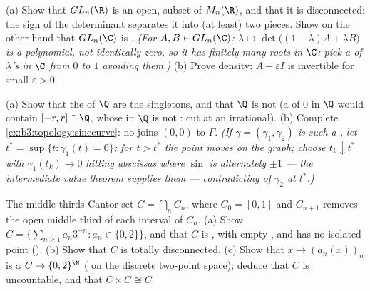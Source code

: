 \begin{exercise}[$\star\star$]\label{exo:b3:topology:8}
(a) Show that $GL_n(\R)$ is an open,  subset of $M_n(\R)$,
and that it is disconnected: the sign of the determinant
separates it into (at least) two pieces. Show on the other hand
that $GL_n(\C)$ is .
\emph{(For $A, B \in GL_n(\C)$: $\lambda \mapsto \det\bigl((1 -
\lambda)A + \lambda B\bigr)$ is a polynomial, not identically
zero, so it has finitely many roots in $\C$: pick a  of
$\lambda$'s in $\C$ from $0$ to $1$ avoiding them.)}
(b) Prove density: $A + \varepsilon I$ is invertible for small
$\varepsilon > 0$.
\end{exercise}

\begin{exercise}[$\star\star$]\label{exo:b3:topology:9}
(a) Show that the  of $\Q$ are the
singletons, and that $\Q$ is not  (a 
 of $0$ in $\Q$ would contain $[-r, r]\cap\Q$,
whose  in $\Q$ is not : cut at an irrational).
(b) Complete \cref{ex:b3:topology:sinecurve}: no  joins
$(0,0)$ to $\Gamma$. \emph{(If $\gamma = (\gamma_1, \gamma_2)$
is such a , let $t^* = \sup\{t : \gamma_1(t) = 0\}$; for $t
> t^*$ the point moves on the graph; choose $t_k \downarrow
t^*$ with $\gamma_1(t_k) \to 0$ hitting abscissas where $\sin$
is alternately $\pm1$ --- the intermediate value theorem
supplies them --- contradicting  of $\gamma_2$ at
$t^*$.)}
\end{exercise}

\begin{exercise}[$\star\star\star$]\label{exo:b3:topology:10}
The middle-thirds Cantor set $C = \bigcap_n C_n$, where $C_0 =
[0,1]$ and $C_{n+1}$ removes the open middle third of each
interval of $C_n$.
(a) Show $C = \bigl\{\sum_{n\geq1} a_n3^{-n} : a_n \in
\{0,2\}\bigr\}$, and that $C$ is , with empty ,
and has no isolated point (\emph{}).
(b) Show that $C$ is totally disconnected.
(c) Show that $x \mapsto (a_n(x))_n$ is a  $C \to
\{0,2\}^\N$ ( on the discrete two-point
space); deduce that $C$ is uncountable, and that $C \times C
\cong C$.
\end{exercise}

